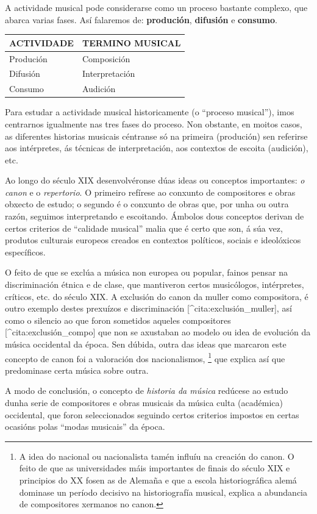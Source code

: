 \documentclass[a4paper, twoside]{templates/ociamthesis}
\begin{document}
A actividade musical pode considerarse como un proceso bastante complexo, que abarca varias fases. Así falaremos de: \textbf{produción}, \textbf{difusión} e \textbf{consumo}.

\begin{longtable}[]{@{}ll@{}}
\toprule
ACTIVIDADE & TERMINO MUSICAL\tabularnewline
\midrule
\endhead
Produción & Composición\tabularnewline
Difusión & Interpretación\tabularnewline
Consumo & Audición\tabularnewline
\bottomrule
\end{longtable}

Para estudar a actividade musical historicamente (o ``proceso musical''), imos centrarnos igualmente nas tres fases do proceso. Non obstante, en moitos casos, as diferentes historias musicais céntranse só na primeira (produción) sen referirse aos intérpretes, ás técnicas de interpretación, aos contextos de escoita (audición), etc.

Ao longo do século XIX desenvolvéronse dúas ideas ou conceptos importantes: \emph{o canon} e o \emph{repertorio}. O primeiro refírese ao conxunto de compositores e obras obxecto de estudo; o segundo é o conxunto de obras que, por unha ou outra razón, seguimos interpretando e escoitando. Ámbolos dous conceptos derivan de certos criterios de ``calidade musical'' malia que é certo que son, á súa vez, produtos culturais europeos creados en contextos políticos, sociais e ideolóxicos específicos.

O feito de que se exclúa a música non europea ou popular, fainos pensar na discriminación étnica e de clase, que mantiveron certos musicólogos, intérpretes, críticos, etc. do século XIX. A exclusión do canon da muller como compositora, é outro exemplo destes prexuízos e discriminación {[}\^{}cita:exclusión\_muller{]}, así como o silencio ao que foron sometidos aqueles compositores {[}\^{}cita:exclusión\_compo{]} que non se axustaban ao modelo ou idea de evolución da música occidental da época. Sen dúbida, outra das ideas que marcaron este concepto de canon foi a valoración dos nacionalismos, \footnote{A idea do nacional ou nacionalista tamén influíu na creación do canon. O feito de que as universidades máis importantes de finais do século XIX e principios do XX fosen as de Alemaña e que a escola historiográfica alemá dominase un período decisivo na historiografía musical, explica a abundancia de compositores xermanos no canon.} que explica así que predominase certa música sobre outra.

A modo de conclusión, o concepto de \emph{historia da música} redúcese ao estudo dunha serie de compositores e obras musicais da música culta (académica) occidental, que foron seleccionados seguindo certos criterios impostos en certas ocasións polas ``modas musicais'' da época.
\end{document}

